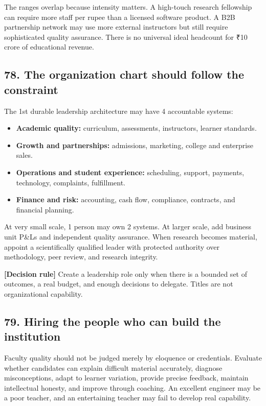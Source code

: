 The ranges overlap because intensity matters. A high-touch research fellowship can require more staff per rupee than a licensed software product. A B2B partnership network may use more external instructors but still require sophisticated quality assurance. There is no universal ideal headcount for \textnormal{₹}10 crore of educational revenue.

\subsection{78. The organization chart should follow the constraint}

The 1st durable leadership architecture may have 4 accountable systems:

\begin{itemize}[leftmargin=*,itemsep=1.5pt]
  \item \textbf{Academic quality:} curriculum, assessments, instructors, learner standards.
  \item \textbf{Growth and partnerships:} admissions, marketing, college and enterprise sales.
  \item \textbf{Operations and student experience:} scheduling, support, payments, technology, complaints, fulfillment.
  \item \textbf{Finance and risk:} accounting, cash flow, compliance, contracts, and financial planning.
\end{itemize}

At very small scale, 1 person may own 2 systems. At larger scale, add business unit P\&Ls and independent quality assurance. When research becomes material, appoint a scientifically qualified leader with protected authority over methodology, peer review, and research integrity.

\textbf{\textbf{[Decision rule]}} Create a leadership role only when there is a bounded set of outcomes, a real budget, and enough decisions to delegate. Titles are not organizational capability.

\subsection{79. Hiring the people who can build the institution}

Faculty quality should not be judged merely by eloquence or credentials. Evaluate whether candidates can explain difficult material accurately, diagnose misconceptions, adapt to learner variation, provide precise feedback, maintain intellectual honesty, and improve through coaching. An excellent engineer may be a poor teacher, and an entertaining teacher may fail to develop real capability.

